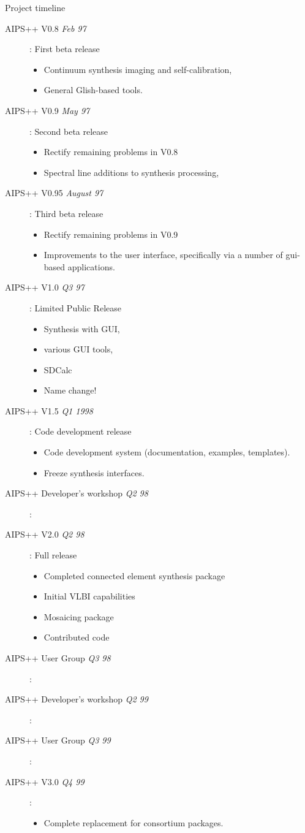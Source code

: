 \begin{slide}{Project timeline}
\begin{description}
\item[AIPS++ V0.8 {\em Feb 97}]: First beta release
\begin{itemize}
\item Continuum synthesis imaging and self-calibration,
\item General Glish-based tools.
\end{itemize}
\item[AIPS++ V0.9 {\em May 97}]: Second beta release
\begin{itemize}
\item Rectify remaining problems in V0.8
\item Spectral line additions to synthesis processing,
\end{itemize}
\item[AIPS++ V0.95 {\em August 97}]: Third beta release
\begin{itemize}
\item Rectify remaining problems in V0.9
\item Improvements to the user interface, specifically via a number of
gui-based applications.
\end{itemize}
\item[AIPS++ V1.0 {\em Q3 97}]: Limited Public Release
\begin{itemize}
\item Synthesis with GUI, 
\item various GUI tools,
\item SDCalc
\item Name change!
\end{itemize}
\item[AIPS++ V1.5 {\em Q1 1998}]: Code development release
\begin{itemize}
\item Code development system (documentation, examples, templates). 
\item Freeze synthesis interfaces.
\end{itemize}
\item[AIPS++ Developer's workshop {\em Q2 98}]:
\item[AIPS++ V2.0 {\em Q2 98}]: Full release
\begin{itemize}
\item Completed connected element synthesis package
\item Initial VLBI capabilities
\item Mosaicing package
\item Contributed code
\end{itemize}
\item[AIPS++ User Group {\em Q3 98}]:
\item[AIPS++ Developer's workshop {\em Q2 99}]:
\item[AIPS++ User Group {\em Q3 99}]:
\item[AIPS++ V3.0 {\em Q4 99}]:
\begin{itemize}
\item Complete replacement for consortium packages.
\end{itemize}
\end{description}
\end{slide}

